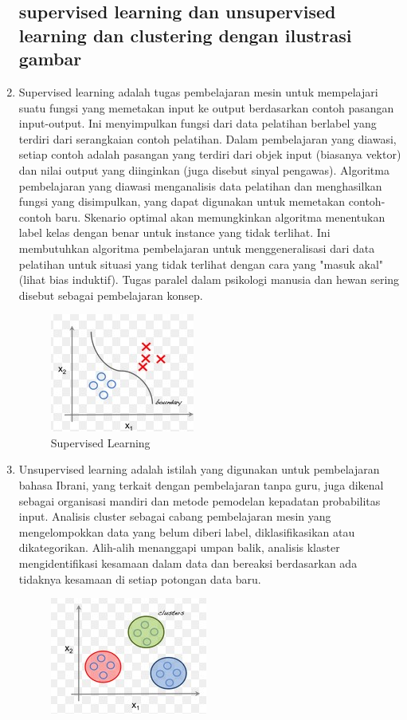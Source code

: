 \begin{enumerate}
\subsection{supervised learning dan unsupervised learning dan clustering
dengan ilustrasi gambar}
\item Supervised learning adalah tugas pembelajaran mesin untuk mempelajari suatu fungsi yang memetakan input ke output berdasarkan contoh pasangan input-output. Ini menyimpulkan fungsi dari data pelatihan berlabel yang terdiri dari serangkaian contoh pelatihan. Dalam pembelajaran yang diawasi, setiap contoh adalah pasangan yang terdiri dari objek input (biasanya vektor) dan nilai output yang diinginkan (juga disebut sinyal pengawas). Algoritma pembelajaran yang diawasi menganalisis data pelatihan dan menghasilkan fungsi yang disimpulkan, yang dapat digunakan untuk memetakan contoh-contoh baru. Skenario optimal akan memungkinkan algoritma menentukan label kelas dengan benar untuk instance yang tidak terlihat. Ini membutuhkan algoritma pembelajaran untuk menggeneralisasi dari data pelatihan untuk situasi yang tidak terlihat dengan cara yang "masuk akal" (lihat bias induktif). Tugas paralel dalam psikologi manusia dan hewan sering disebut sebagai pembelajaran konsep.
\begin{figure}[ht]
\centering
\includegraphics[scale=0.5]{figures/f2.jpg}
\caption{Supervised Learning}
\label{contoh}
\end{figure}
\item Unsupervised learning adalah istilah yang digunakan untuk pembelajaran bahasa Ibrani, yang terkait dengan pembelajaran tanpa guru, juga dikenal sebagai organisasi mandiri dan metode pemodelan kepadatan probabilitas input. Analisis cluster sebagai cabang pembelajaran mesin yang mengelompokkan data yang belum diberi label, diklasifikasikan atau dikategorikan. Alih-alih menanggapi umpan balik, analisis klaster mengidentifikasi kesamaan dalam data dan bereaksi berdasarkan ada tidaknya kesamaan di setiap potongan data baru.
\begin{figure}[ht]
\centering
\includegraphics[scale=0.5]{figures/f3.jpg}

\end{figure}
\end{enumerate}
